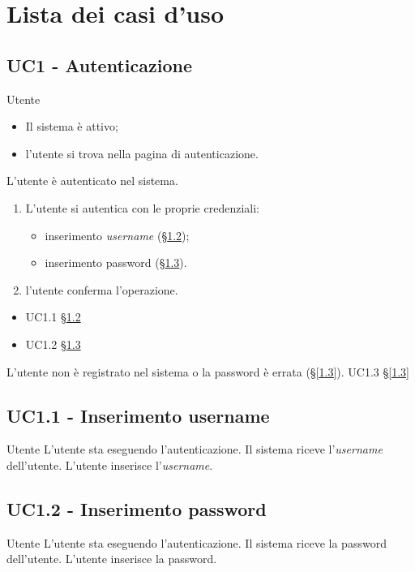 \section{Lista dei casi d'uso}

\subsection{UC1 - Autenticazione}
\label{1}
{Utente}
{   \begin{itemize}
        \item Il sistema è attivo;
        \item l'utente si trova nella pagina di autenticazione.
    \end{itemize}
}
{L'utente è autenticato nel sistema.}
{   \begin{enumerate}
        \item L'utente si autentica con le proprie credenziali:
            \begin{itemize}
                \item inserimento \textit{username} (§\ref{1.1});
                \item inserimento password (§\ref{1.2}).
            \end{itemize}
        \item l'utente conferma l'operazione.
    \end{enumerate}
}
{   \begin{itemize}
        \item UC1.1 §\ref{1.1}
        \item UC1.2 §\ref{1.2}
    \end{itemize} 
}
{L'utente non è registrato nel sistema o la password è errata (§\ref{1.3}).}
{UC1.3 §\ref{1.3}}{}


\subsection{UC1.1 - Inserimento username}
\label{1.1}
\makeUC{}
{Utente}
{L'utente sta eseguendo l'autenticazione.}
{Il sistema riceve l'\textit{username} dell'utente.}
{L'utente inserisce l'\textit{username}.}{}{}{}{}


\subsection{UC1.2 - Inserimento password}
\label{1.2}
\makeUC{}
{Utente}
{L'utente sta eseguendo l'autenticazione.}
{Il sistema riceve la password dell'utente.}
{L'utente inserisce la password.}{}{}{}{}


